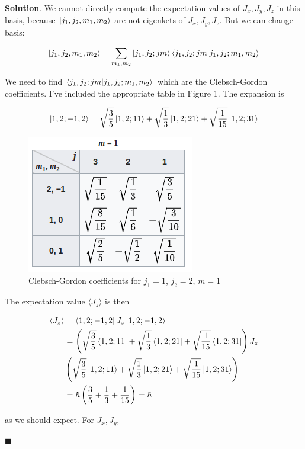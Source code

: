 \documentclass[12pt]{article}
\theoremstyle{definition}
\newenvironment{s}{%
        \begin{trivlist} \item \textbf{Solution}. }{%
            \hspace*{\fill} $\blacksquare$\end{trivlist}}%
\begin{document}
{\begin{s}
We cannot directly compute the expectation values of $J_x, J_y, J_z$ in this basis, because $\ket{j_1, j_2, m_1, m_2}$ are not eigenkets of $J_x, J_y, J_z$. But we can change basis:

\begin{align*}
\ket{j_1, j_2, m_1, m_2} = \sum_{m_1,m_2} \ket{j_1,j_2; jm}\bra{j_1,j_2; jm}\ket{j_{1}, j_{2}; m_{1},m_{2}}
\end{align*}

We need to find $\bra{j_1,j_2; jm}\ket{j_{1}, j_{2}; m_{1},m_{2}}$ which are the Clebsch-Gordon coefficients. I've included the appropriate table in Figure 1. The expansion is

\begin{align*}
\ket{1,2;-1,2} = \sqrt{\frac{3}{5}}\ket{1,2;1 1} + \sqrt{\frac{1}{3}}\ket{1,2;2 1} + \sqrt{\frac{1}{15}}\ket{1,2;3 1}
\end{align*}

\begin{figure}
\centering
\includegraphics[scale=0.75]{cb-table.png}
\caption{Clebsch-Gordon coefficients for $j_{1} = 1$, $j_{2} = 2$, $m=1$}
\end{figure}


The expectation value $\langle J_z \rangle$ is then

\begin{align*}
\langle J_z \rangle &= \bra{1,2;-1,2} J_z \ket{1,2;-1,2} \\
&= \left(\sqrt{\frac{3}{5}}\bra{1,2;1 1} + \sqrt{\frac{1}{3}}\bra{1,2;2 1} + \sqrt{\frac{1}{15}}\bra{1,2;3 1}\right)J_{z}\\
&\left(\sqrt{\frac{3}{5}}\ket{1,2;1 1} + \sqrt{\frac{1}{3}}\ket{1,2;2 1} + \sqrt{\frac{1}{15}}\ket{1,2;3 1}\right)\\
&= \hbar\left(\frac{3}{5}+\frac{1}{3}+\frac{1}{15}\right) = \hbar
\end{align*}

as we should expect. For $J_x, J_y$, 


\end{s}}
\end{document}

